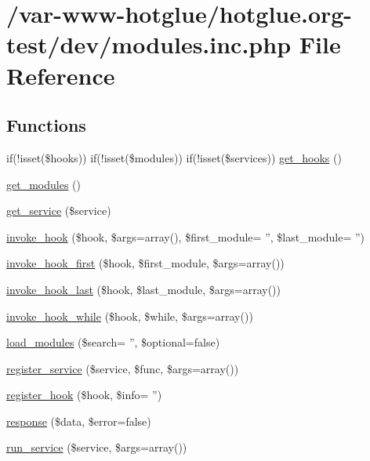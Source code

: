 \hypertarget{modules_8inc_8php}{
\section{/var-\/www-\/hotglue/hotglue.org-\/test/dev/modules.inc.php File Reference}
\label{modules_8inc_8php}
}
\subsection*{Functions}
\begin{DoxyCompactItemize}
\item 
if(!isset(\$hooks)) if(!isset(\$modules)) if(!isset(\$services)) \hyperlink{modules_8inc_8php_adcaa12e356133b7fa0670571698b38cc}{get\_\-hooks} ()
\item 
\hyperlink{modules_8inc_8php_a1b73e435e11b07906d0781b146b4aa21}{get\_\-modules} ()
\item 
\hyperlink{modules_8inc_8php_abf7633223c2fd4ecb199a8e0dc070802}{get\_\-service} (\$service)
\item 
\hyperlink{modules_8inc_8php_a92ef7c094f294cfec43a3bb53227a21a}{invoke\_\-hook} (\$hook, \$args=array(), \$first\_\-module= '', \$last\_\-module= '')
\item 
\hyperlink{modules_8inc_8php_acac937809bdb98ce29616134e43050ed}{invoke\_\-hook\_\-first} (\$hook, \$first\_\-module, \$args=array())
\item 
\hyperlink{modules_8inc_8php_ae1ff036fae9d272fe1d58dff8a9caed2}{invoke\_\-hook\_\-last} (\$hook, \$last\_\-module, \$args=array())
\item 
\hyperlink{modules_8inc_8php_a66473fc9f24153d85053f1f9c6ed83e4}{invoke\_\-hook\_\-while} (\$hook, \$while, \$args=array())
\item 
\hyperlink{modules_8inc_8php_a23f8be02dc2148a3c860119a1d6ea276}{load\_\-modules} (\$search= '', \$optional=false)
\item 
\hyperlink{modules_8inc_8php_ae6ed600fb2ce39a4b0837bbb01fe8d6e}{register\_\-service} (\$service, \$func, \$args=array())
\item 
\hyperlink{modules_8inc_8php_ad91a5f96df0655d782404170324e567d}{register\_\-hook} (\$hook, \$info= '')
\item 
\hyperlink{modules_8inc_8php_a361058ff2a03c098045c4442440a2574}{response} (\$data, \$error=false)
\item 
\hyperlink{modules_8inc_8php_a3d581f1636df2e24ffe7b013a12fb1db}{run\_\-service} (\$service, \$args=array())
\end{DoxyCompactItemize}


